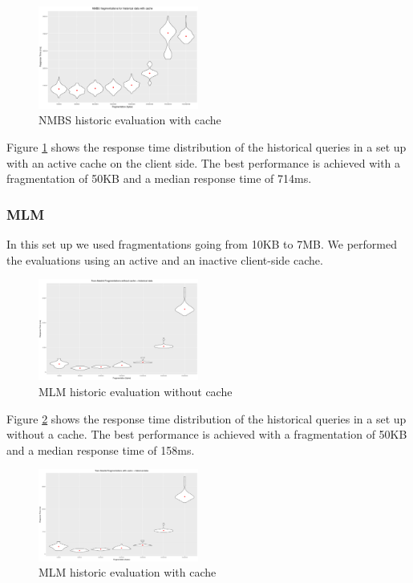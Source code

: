 \documentclass[sw]{iosart2x}
\begin{document}
	\begin{figure}[h]
		\includegraphics[width=0.47\textwidth]{nmbs/historic_cache.png}
		\caption{NMBS historic evaluation with cache}\label{fig:nmbs_historic_cache}
	\end{figure}
	
	Figure \ref{fig:nmbs_historic_cache} shows the response time distribution of the historical queries in a set up with an active cache on the client side. The best performance is achieved with a fragmentation of 50KB and a median response time of 714ms.
	
	\subsubsection{MLM}
	In this set up we used fragmentations going from 10KB to 7MB. We performed the evaluations using an active and an inactive client-side cache.
	
	\begin{figure}[h]
		\includegraphics[width=0.47\textwidth]{mlm/historic_no_cache.png}
		\caption{MLM historic evaluation without cache}\label{fig:mlm_historic_no_cache}
	\end{figure}
	
	Figure \ref{fig:mlm_historic_no_cache} shows the response time distribution of the historical queries in a set up without a cache. The best performance is achieved with a fragmentation of 50KB and a median response time of 158ms.
	
	\begin{figure}[h]
		\includegraphics[width=0.47\textwidth]{mlm/historic_cache.png}
		\caption{MLM historic evaluation with cache}\label{fig:mlm_historic_cache}
	\end{figure}
	
\end{document}
